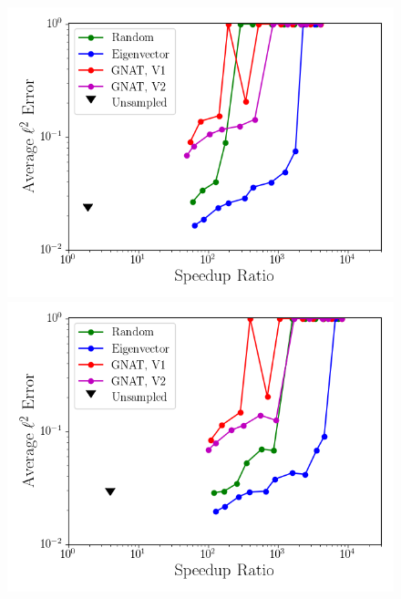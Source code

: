 \begin{figure}
	\begin{minipage}{0.49\linewidth}
		\includegraphics[width=0.99\linewidth]{Chapters/CavityAndCVRC/Images/cvrc/deim/sampled_dt2p5e-7_Average_errorRaw_pareto.png}
		\subcaption{$\dt = 2.5 \times \dtFOM$}
	\end{minipage}
	\begin{minipage}{0.49\linewidth}
		\includegraphics[width=0.99\linewidth]{Chapters/CavityAndCVRC/Images/cvrc/deim/sampled_dt5e-7_Average_errorRaw_pareto.png}
		\subcaption{$\dt = 5 \times \dtFOM$}
	\end{minipage}


\end{figure}
